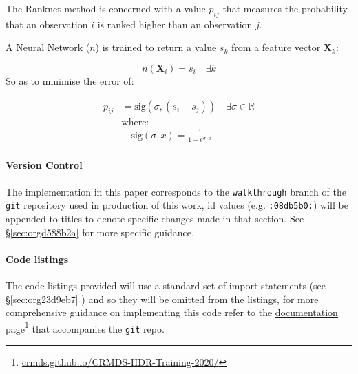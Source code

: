 \documentclass[a4paper,11pt,twoside]{article}
\begin{document}
The Ranknet method is concerned with a value \(p_{ij}\) that
measures the probability that an observation \(i\) is ranked higher
than an observation \(j\).

A Neural Network (\(n\)) is trained to return a value
\(s_k\) from a feature vector \(\mathbf{X}_k\):

 \[n(\mathbf{X}_i) = s_i \quad \exists k\]
So as to minimise the error of:




\begin{align} 
 p_{ij} &= \mathrm{sig}\left(\sigma, (s_i-s_j) \right) \quad \exists \sigma \in \mathbb{R} \\
 &\text{where:} \nonumber \\
 &\quad  \mathrm{sig}\left(\sigma, x\right) = \frac{1}{1+e^{\sigma \cdot x}} 
\end{align} 



\paragraph{Version Control}
\label{sec:orge5e4e79}
The implementation in this paper corresponds to the \texttt{walkthrough} branch
of the \texttt{git} repository used in production of this work, id values
(e.g. \texttt{:08db5b0:}) will be appended to titles to denote specific
changes made in that section. See \S \ref{sec:orgd588b2a} for
more specific guidance.

\paragraph{Code listings}
\label{sec:orga0e78f4}
The code listings provided will use a standard set of import
statements (see \S \ref{sec:org23d9eb7} ) and so they will be
omitted from the listings, for more comprehensive guidance on
implementing this code refer to the \href{https://crmds.github.io/CRMDS-HDR-Training-2020/}{documentation page}\footnote{\href{https://crmds.github.io/CRMDS-HDR-Training-2020/}{crmds.github.io/CRMDS-HDR-Training-2020/}} that
accompanies the \texttt{git} repo.
\end{document}
